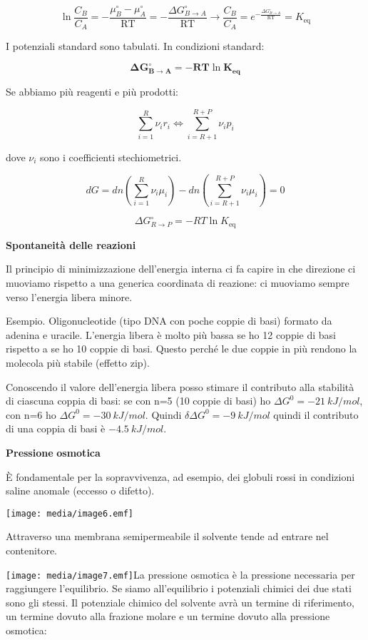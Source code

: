 \[\ln\frac{C_{B}}{C_{A}} = - \frac{\mu_{B}^{\circ} - \mu_{A}^{\circ}}{\text{RT}} = - \frac{\Delta G_{B \rightarrow A}^{\circ}}{\text{RT}} \rightarrow \frac{C_{B}}{C_{A}} = e^{- \frac{\Delta G_{B \rightarrow A}^{\circ}}{\text{RT}}} = K_{\text{eq}}\]

I potenziali standard sono tabulati. In condizioni standard:

\[\mathbf{\Delta}\mathbf{G}_{\mathbf{B \rightarrow A}}^{\mathbf{\circ}}\mathbf{= - RT}\ln\mathbf{K}_{\mathbf{\text{eq}}}\]

Se abbiamo più reagenti e più prodotti:

\[\sum_{i = 1}^{R}{\nu_{i}r_{i}} \Longleftrightarrow \sum_{i = R + 1}^{R + P}{\nu_{i}p_{i}}\]

dove \(\nu_{i}\) sono i coefficienti stechiometrici.

\[dG = dn\left( \sum_{i = 1}^{R}{\nu_{i}\mu_{i}} \right) - dn\left( \sum_{i = R + 1}^{R + P}{\nu_{i}\mu_{i}} \right) = 0\]

\[\Delta G_{R \rightarrow P}^{\circ} = - RT\ln K_{\text{eq}}\]

\textbf{Spontaneità delle reazioni}

Il principio di minimizzazione dell'energia interna ci fa capire in che
direzione ci muoviamo rispetto a una generica coordinata di reazione: ci
muoviamo sempre verso l'energia libera minore.

Esempio. Oligonucleotide (tipo DNA con poche coppie di basi) formato da
adenina e uracile. L'energia libera è molto più bassa se ho 12 coppie di
basi rispetto a se ho 10 coppie di basi. Questo perché le due coppie in
più rendono la molecola più stabile (effetto zip).

Conoscendo il valore dell'energia libera posso stimare il contributo
alla stabilità di ciascuna coppia di basi: se con n=5 (10 coppie di
basi) ho \(\Delta G^{0} = - 21\ kJ/mol\), con n=6 ho
\(\Delta G^{0} = - 30\ kJ/mol\). Quindi
\(\delta\Delta G^{0} = - 9\ kJ/mol\) quindi il contributo di una coppia
di basi è \(- 4.5\ kJ/mol\).

\textbf{Pressione} \textbf{osmotica}

È fondamentale per la sopravvivenza, ad esempio, dei globuli rossi in
condizioni saline anomale (eccesso o difetto).

\texttt{[image: media/image6.emf]}

Attraverso una membrana semipermeabile il solvente tende ad entrare nel
contenitore.

\texttt{[image: media/image7.emf]}La
pressione osmotica è la pressione necessaria per raggiungere
l'equilibrio. Se siamo all'equilibrio i potenziali chimici dei due stati
sono gli stessi. Il potenziale chimico del solvente avrà un termine di
riferimento, un termine dovuto alla frazione molare e un termine dovuto
alla pressione osmotica:

